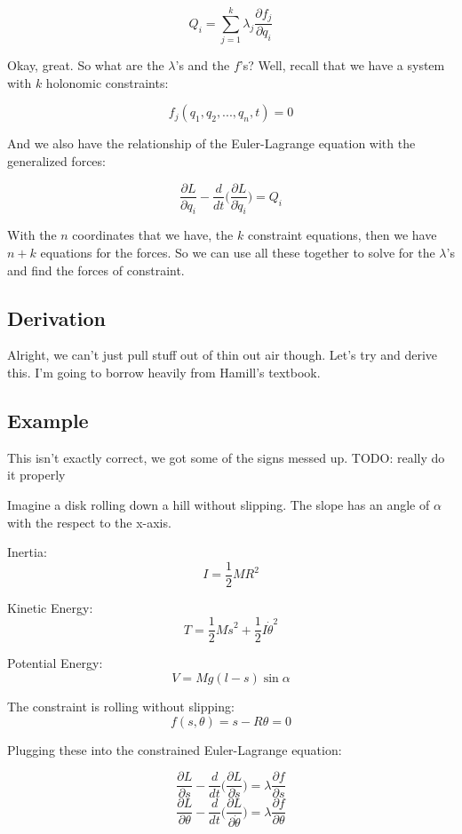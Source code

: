 \documentclass{article}
\begin{document}
\begin{equation}
Q_i = \sum_{j=1}^k \lambda_j \frac{ \partial f_j }{ \partial q_i }
\end{equation}

Okay, great.  So what are the $\lambda$'s and the $f$'s?  Well, recall that we have a system with $k$ holonomic constraints:

$$f_j( q_1, q_2, ..., q_n, t ) = 0$$

And we also have the relationship of the Euler-Lagrange equation with the generalized forces:

$$\frac{ \partial L }{ \partial q_i } - \frac{ d }{ dt } \Big( \frac{ \partial L }{ \partial \dot{ q }_i } \Big) = Q_i$$

With the $n$ coordinates that we have, the $k$ constraint equations, then we have $n + k$ equations for the forces.  So we can use all these together to solve for the $\lambda$'s and find the forces of constraint.

%
%
%
\subsection{Derivation}

Alright, we can't just pull stuff out of thin out air though.  Let's try and derive this.  I'm going to borrow heavily from Hamill's textbook.

%
%
%
\subsection{Example}

This isn't exactly correct, we got some of the signs messed up.  TODO: really do it properly

Imagine a disk rolling down a hill without slipping.  The slope has an angle of $\alpha$ with the respect to the x-axis.

Inertia:
$$I = \frac{ 1 }{ 2 } MR^2$$

Kinetic Energy:
$$T = \frac{ 1 }{ 2 }M\dot{ s }^2 + \frac{ 1 }{ 2 }I\dot{ \theta }^2$$

Potential Energy:
$$V = Mg( l - s )\sin{ \alpha }$$

The constraint is rolling without slipping:
$$f( s, \theta ) = s - R\theta = 0$$

Plugging these into the constrained Euler-Lagrange equation:

$$\frac{ \partial L }{ \partial s } - \frac{ d }{ dt } \Big( \frac{ \partial L }{ \partial \dot{ s } } \Big) = \lambda \frac{ \partial f }{ \partial s }$$
$$\frac{ \partial L }{ \partial \theta } - \frac{ d }{ dt } \Big( \frac{ \partial L }{ \partial \dot{ \theta } } \Big) = \lambda \frac{ \partial f }{ \partial \theta }$$
\end{document}
